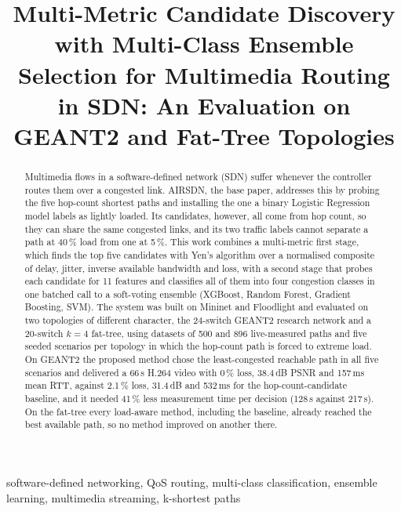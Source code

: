 \documentclass[conference,a4paper]{IEEEtran}
\newcommand{\tofill}[1]{\textcolor{red}{[#1]}}
\begin{document}
\title{Multi-Metric Candidate Discovery with Multi-Class Ensemble Selection for Multimedia Routing in SDN:
An Evaluation on GEANT2 and Fat-Tree Topologies}

\author{\IEEEauthorblockN{\tofill{Student names}}
\IEEEauthorblockA{\tofill{Department, Institution}\\ \tofill{e-mail addresses}}}

\maketitle

\begin{abstract}
Multimedia flows in a software-defined network (SDN) suffer whenever the controller routes them over a congested
link. AIRSDN, the base paper, addresses this by probing the five hop-count shortest paths and installing the one a
binary Logistic Regression model labels as lightly loaded. Its candidates, however, all come from hop count, so they
can share the same congested links, and its two traffic labels cannot separate a path at 40\,\% load from one at
5\,\%. This work combines a multi-metric first stage, which finds the top five candidates with Yen's algorithm over
a normalised composite of delay, jitter, inverse available bandwidth and loss, with a second stage that probes each
candidate for 11 features and classifies all of them into four congestion classes in one batched call to a
soft-voting ensemble (XGBoost, Random Forest, Gradient Boosting, SVM). The system was built on Mininet and
Floodlight and evaluated on two topologies of different character, the 24-switch GEANT2 research network and a
20-switch $k=4$ fat-tree, using datasets of 500 and 896 live-measured paths and five seeded scenarios per topology
in which the hop-count path is forced to extreme load. On GEANT2 the proposed method chose the least-congested
reachable path in all five scenarios and delivered a 66\,s H.264 video with 0\,\% loss, 38.4\,dB PSNR and
157\,ms mean RTT, against 2.1\,\% loss, 31.4\,dB and 532\,ms for the hop-count-candidate baseline, and it needed
41\,\% less measurement time per decision (128\,s against 217\,s). On the fat-tree every load-aware method,
including the baseline, already reached the best available path, so no method improved on another there.
\end{abstract}

\begin{IEEEkeywords}
software-defined networking, QoS routing, multi-class classification, ensemble learning, multimedia streaming,
k-shortest paths
\end{IEEEkeywords}
\end{document}

